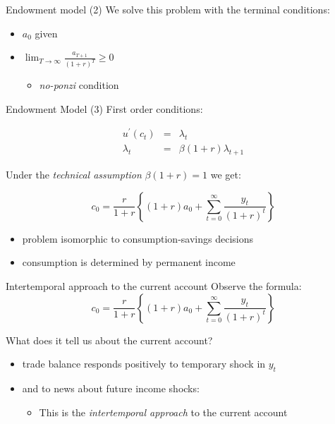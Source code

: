 \documentclass[
  ignorenonframetext,
]{beamer}
\providecommand{\tightlist}{%
  \setlength{\itemsep}{0pt}\setlength{\parskip}{0pt}}\usepackage{longtable,booktabs,array}
\begin{document}
\begin{frame}{Endowment model (2)}
\label{endowment-model-2}
We solve this problem with the terminal conditions:

\begin{itemize}
\item
  \(a_0\) given
\item
  \(\lim_{T\rightarrow\infty} \frac{a_{T+1}}{(1+r)^T}\geq0\)

  \begin{itemize}
  \tightlist
  \item
    \emph{no-ponzi} condition
  \end{itemize}
\end{itemize}
\end{frame}

\begin{frame}{Endowment Model (3)}
\label{endowment-model-3}
First order conditions:

\begin{align}
u^{\prime}(c_t)& =& \lambda_t \\
 \lambda_t &=& \beta (1+r) \lambda_{t+1}
\end{align}

Under the \emph{technical assumption} \(\beta (1+r)=1\) we get:

\[c_0 = \frac{r}{1+r}\left\{ (1+r) a_0 + \sum_{t=0}^{\infty} \frac{y_t}{(1+r)^t}\right\}\]

\pause

\begin{itemize}
\tightlist
\item
  problem isomorphic to consumption-savings decisions
\item
  consumption is determined by permanent income
\end{itemize}
\end{frame}

\begin{frame}{Intertemporal approach to the current account}
\label{intertemporal-approach-to-the-current-account}
Observe the formula:
\[c_0 = \frac{r}{1+r}\left\{ (1+r) a_0 + \sum_{t=0}^{\infty} \frac{y_t}{(1+r)^t}\right\}\]

What does it tell us about the current account?

\pause

\begin{itemize}
\tightlist
\item
  trade balance responds positively to temporary shock in \(y_t\)
\item
  and to news about future income shocks:

  \begin{itemize}
  \tightlist
  \item
    This is the \emph{intertemporal approach} to the current account
  \end{itemize}
\end{itemize}
\end{frame}
\end{document}

